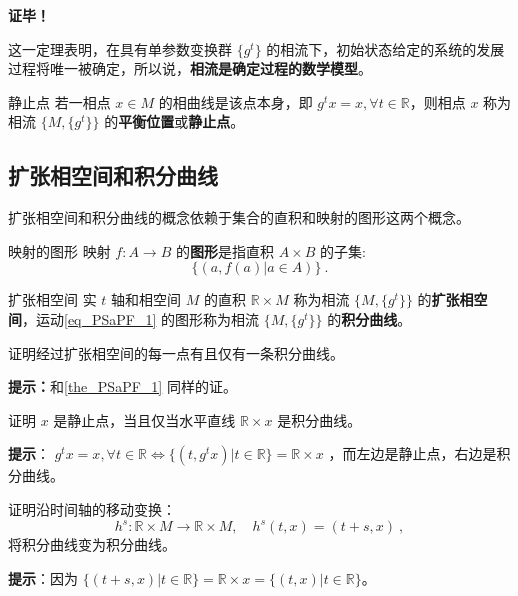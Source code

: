 \textbf{证毕！}

这一定理表明，在具有单参数变换群 $\{g^t\}$ 的相流下，初始状态给定的系统的发展过程将唯一被确定，所以说，\textbf{相流是确定过程的数学模型}。
\begin{definition}{静止点}
若一相点 $x\in M$ 的相曲线是该点本身，即 $g^t x=x,\forall t\in\mathbb R$，则相点 $x$ 称为相流 $\{M,\{g^t\}\}$ 的\textbf{平衡位置}或\textbf{静止点}。
\end{definition}
\subsection{扩张相空间和积分曲线}\label{sub_PSaPF_1}
扩张相空间和积分曲线的概念依赖于集合的直积和映射的图形这两个概念。
\begin{definition}{映射的图形}
映射 $f:A\rightarrow B$ 的\textbf{图形}是指直积 $A\times B$ 的子集:
\begin{equation}
\{(a,f(a)|a\in A)\}~.
\end{equation}
\end{definition}
\begin{definition}{扩张相空间}\label{def_PSaPF_2}
实 $t$ 轴和相空间 $M$ 的直积 $\mathbb R\times M$ 称为相流 $\{M,\{g^t\}\}$ 的\textbf{扩张相空间}，运动\autoref{eq_PSaPF_1} 的图形称为相流 $\{M,\{g^t\}\}$ 的\textbf{积分曲线}。
\end{definition}
\begin{exercise}{}
证明经过扩张相空间的每一点有且仅有一条积分曲线。
\end{exercise}
\textbf{提示：}和\autoref{the_PSaPF_1} 同样的证。

\begin{exercise}{}
证明 $x$ 是静止点，当且仅当水平直线 $\mathbb R\times x$ 是积分曲线。
\end{exercise}
\textbf{提示}： $g^t x=x,\forall t\in\mathbb R\Leftrightarrow\{(t,g^t x)|t\in \mathbb R\}=\mathbb R\times x$ ，而左边是静止点，右边是积分曲线。
\begin{exercise}{}
证明沿时间轴的移动变换：
\begin{equation}
h^s:\mathbb R\times M\rightarrow\mathbb R\times M,\quad h^s(t,x)=(t+s,x)~,
\end{equation}
将积分曲线变为积分曲线。
\end{exercise}
\textbf{提示}：因为 $\{(t+s,x)|t\in\mathbb R\}=\mathbb R\times x=\{(t,x)|t\in\mathbb R\}$。

